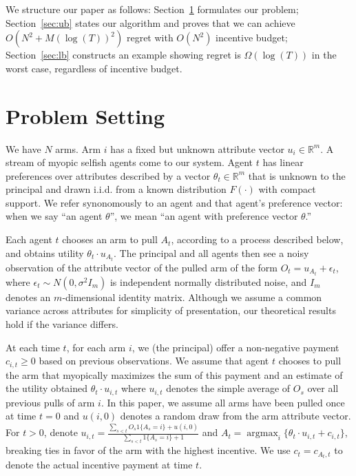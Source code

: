 \documentclass{article}
\newcommand{\argmax}{\mathop{\mathrm{argmax}}}
\begin{document}
We structure our paper as follows: Section~\ref{sec:prob} formulates our problem; Section~\ref{sec:ub} states our algorithm and proves that we can achieve $O(N^2+M(\log(T))^2)$ regret with $O(N^2)$ incentive budget; Section~\ref{sec:lb} constructs an example showing regret is $\Omega(\log(T))$ in the worst case, regardless of incentive budget.




\section{Problem Setting}
\label{sec:prob}

We have $N$ arms. Arm $i$ has a fixed but unknown attribute vector $u_i\in \mathbb{R}^{m}$. 
A stream of myopic selfish agents come to our system.  Agent $t$ has linear preferences over attributes described by a vector $\theta_t \in \mathbb{R}^m$ that is unknown to the principal and drawn i.i.d. from a known distribution $F(\cdot)$ with compact support. We refer synonomously to an agent and that agent's preference vector: when we say ``an agent $\theta$'', we mean ``an agent with preference vector $\theta$.''

Each agent $t$ chooses an arm to pull $A_t$, according to a process described below, and obtains utility $\theta_t \cdot u_{A_{t}}$.  The principal and all agents then see a noisy observation of the attribute vector of the pulled arm of the form $O_t=u_{A_{t}}+\epsilon_{t}$, where $\epsilon_t\sim N(0, \sigma^2 I_{m})$ is independent normally distributed noise, and $I_m$ denotes an $m$-dimensional identity matrix.  Although we assume a common variance across attributes for simplicity of presentation, our theoretical results hold if the variance differs.

At each time $t$, for each arm $i$, we (the principal) offer a non-negative payment $c_{i,t}\geq 0$ based on previous observations.
We assume that agent $t$ chooses to pull the arm that myopically maximizes the sum of this payment and an estimate of the utility obtained $\theta_t \cdot u_{i,t}$ where $u_{i,t}$ denotes the simple average of $O_s$ over all previous pulls of arm $i$. In this paper, we assume all arms have been pulled once at time $t=0$ and $u(i,0)$ denotes a random draw from the arm attribute vector. For $t>0$, denote $u_{i,t} = \frac{\sum_{s<t} O_s 1\{A_s = i\} + u(i,0)}{\sum_{s<t} 1\{A_s = i\}+1}$ and $A_t=\argmax_{i}\{\theta_t\cdot u_{i,t}+c_{i,t}\}$, breaking ties in favor of the arm with the highest incentive.  We use $c_t=c_{A_{t},t}$ to denote the actual incentive payment at time $t$.
\end{document}
